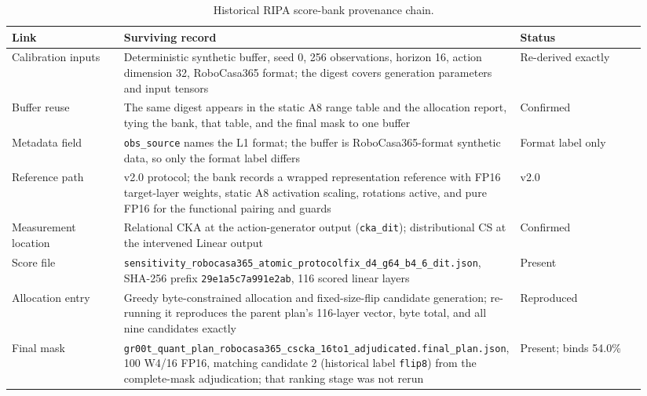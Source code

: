 \begin{table}[H]
\centering
\caption{Historical RIPA score-bank provenance chain.}
\label{tab:ripa_provenance}
\footnotesize
\setlength{\tabcolsep}{4pt}
\begin{tabular}{@{}p{0.19\linewidth}p{0.53\linewidth}p{0.22\linewidth}@{}}
\toprule
Link & Surviving record & Status \\
\midrule
Calibration inputs & Deterministic synthetic buffer, seed 0, 256 observations, horizon 16, action dimension 32, RoboCasa365 format; the digest covers generation parameters and input tensors & Re-derived exactly \\
Buffer reuse & The same digest appears in the static A8 range table and the allocation report, tying the bank, that table, and the final mask to one buffer & Confirmed \\
Metadata field & \texttt{obs\_source} names the L1 format; the buffer is RoboCasa365-format synthetic data, so only the format label differs & Format label only \\
Reference path & v2.0 protocol; the bank records a wrapped representation reference with FP16 target-layer weights, static A8 activation scaling, rotations active, and pure FP16 for the functional pairing and guards & v2.0 \\
Measurement location & Relational CKA at the action-generator output (\texttt{cka\_dit}); distributional CS at the intervened Linear output & Confirmed \\
Score file & \nolinkurl{sensitivity_robocasa365_atomic_protocolfix_d4_g64_b4_6_dit.json}, SHA-256 prefix \texttt{29e1a5c7a991e2ab}, 116 scored linear layers & Present \\
Allocation entry & Greedy byte-constrained allocation and fixed-size-flip candidate generation; re-running it reproduces the parent plan's 116-layer vector, byte total, and all nine candidates exactly & Reproduced \\
Final mask & \nolinkurl{gr00t_quant_plan_robocasa365_cscka_16to1_adjudicated.final_plan.json}, 100 W4/16 FP16, matching candidate 2 (historical label \texttt{flip8}) from the complete-mask adjudication; that ranking stage was not rerun & Present; binds 54.0\% \\
\bottomrule
\end{tabular}
\end{table}

